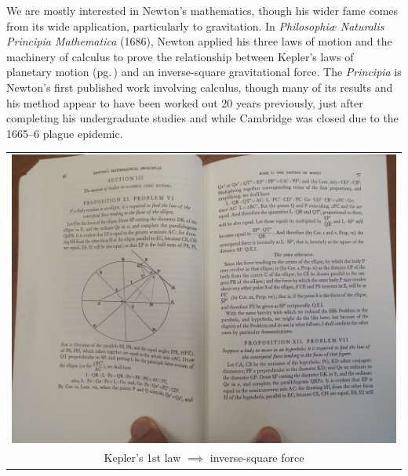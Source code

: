 \begin{minipage}[t]{0.53\linewidth}\vspace{-4pt}
	We are mostly interested in Newton's mathematics, though his wider fame comes from its wide application, particularly to gravitation. In \emph{Philosophiæ Naturalis Principia Mathematica} (1686), Newton applied his three laws of motion\footnotemark{} and the machinery of calculus to prove the relationship between Kepler's laws of planetary motion (pg.\,\pageref{pg:keplerslaws}) and an inverse-square gravitational force. The \emph{Principia} is Newton's first published work involving calculus, though many of its results and his method appear to have been worked out 20 years previously, just after completing his undergraduate studies and while Cambridge was closed due to the 1665--6 plague epidemic.
\end{minipage}
\hfill
\begin{minipage}[t]{0.44\linewidth}\vspace{-5pt}
	\flushright
	\begin{tabular}{@{}c@{}}
		\includegraphics[width=\textwidth]{newton5.jpg}\\
		Kepler's 1st law $\implies$ inverse-square force
	\end{tabular}
\end{minipage}\smallbreak


\goodbreak
 
